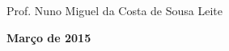 \begin{titlepage}
\begin{center}
\begin{tabbing}
		   \hspace{1.1cm}Prof. Nuno Miguel da Costa de Sousa Leite \\
		\end{tabbing}
		
		\fontsize{10pt}{10pt}\selectfont
		\textbf{Março de 2015}
	\end{center}
	
\iffalse

	\newpage
	\thispagestyle{empty}
	\cleardoublepage
	\newpage
	\thispagestyle{empty}
	

\end{titlepage}
